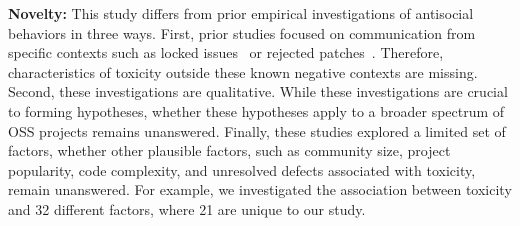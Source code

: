 \vspace{3pt}
\noindent \textbf{Novelty:} This study differs from prior empirical investigations of antisocial behaviors in three ways. First, prior studies focused on communication from specific contexts
such as locked issues~\cite{miller2022did,raman2020stress} or rejected patches~\cite{ferreira2021shut}. Therefore, characteristics of toxicity outside these known negative contexts are missing. Second, these investigations are qualitative. While these investigations are crucial to forming hypotheses, whether these hypotheses apply to a broader spectrum of OSS projects remains unanswered. Finally, these studies explored a limited set of factors, whether other plausible factors, such as community size, project popularity, code complexity, and unresolved defects associated with toxicity, remain unanswered. For example, we investigated the association between toxicity and 32 different factors, where 21 are unique to our study.

